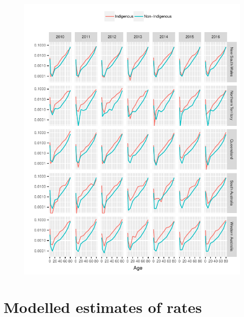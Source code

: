 \documentclass{article}
\begin{document}
\begin{figure}
  \centering
  \includegraphics{out/fig_rates_direct_Male}
\end{figure}
\newpage

\clearpage
\section{Modelled estimates of rates}
\newpage
\end{document}
